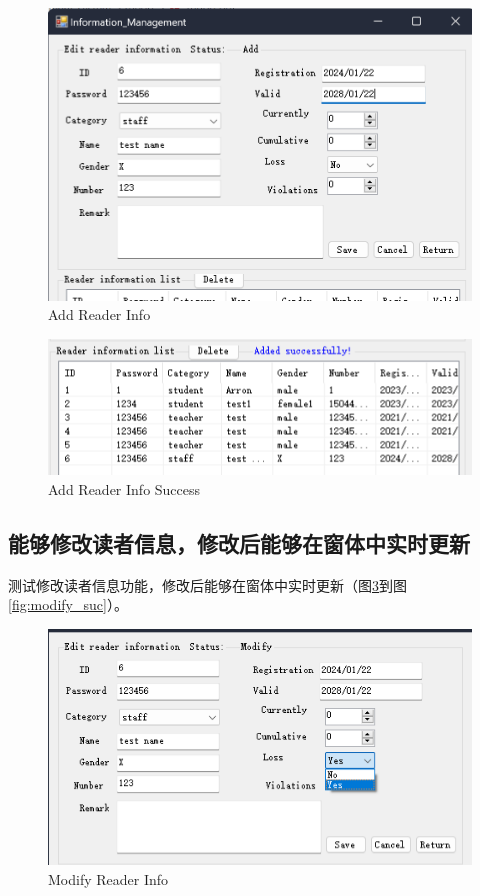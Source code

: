 \documentclass{article}
\begin{document}
\begin{figure}[H]
    \centering
    \includegraphics[width=1\textwidth]{../pic/add.png}
    \caption{Add Reader Info}
    \label{fig:add}
\end{figure}

\begin{figure}[H]
    \centering
    \includegraphics[width=1\textwidth]{../pic/add_suc.png}
    \caption{Add Reader Info Success}
    \label{fig:add_suc}
\end{figure}

\subsection{能够修改读者信息，修改后能够在窗体中实时更新}
测试修改读者信息功能，修改后能够在窗体中实时更新（图\ref{fig:modify}到图\ref{fig:modify_suc}）。

\begin{figure}[H]
    \centering
    \includegraphics[width=1\textwidth]{../pic/modify.png}
    \caption{Modify Reader Info}
    \label{fig:modify}
\end{figure}
\end{document}

